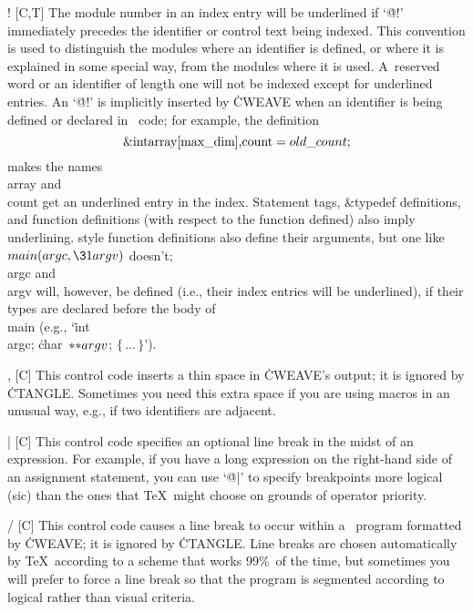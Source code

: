 \@! [C,T] The module number in an index entry will be underlined if `\.{@!}'
immediately precedes the identifier or control text being indexed. This
convention is used to distinguish the modules where an identifier is
defined, or where it is explained in some special way, from the modules
where it is used. A~reserved word or an identifier of length one will not be
indexed except for underlined entries. An `\.{@!}' is implicitly inserted by
\.{CWEAVE} when an identifier is being defined or declared in \Cee\ code;
for example, the definition $$\hbox{\&{int} \\{array}[\\{max\_dim}],
\\{count}${}=\\{old\_count};$}$$ makes the names \\{array} and \\{count} get
an underlined entry in the index.  Statement tags, \&{typedef} definitions,
and function definitions (with respect to the function defined) also imply
underlining.  style function definitions also define their
arguments, but one like $\\{main}(\\{argc},\31\\{argv})$ doesn't; \\{argc}
and \\{argv} will, however, be defined (i.e., their index entries will be
underlined), if their types are declared before the body of \\{main} (e.g.,
`\.{int}~\\{argc}; \.{char}~${**}\\{argv}$; $\{\,\ldots\,\}$').

\@, [C] This control code inserts a thin space in \.{CWEAVE}'s output; it is
ignored by \.{CTANGLE}. Sometimes you need this extra space if you are using
macros in an unusual way, e.g., if two identifiers are adjacent.

\@| [C] This control code specifies an optional line break in the midst of
an expression. For example, if you have
a long expression on the right-hand side of an assignment
statement, you can use `\.{@|}' to specify breakpoints more logical (sic)
than the ones that \TeX\ might choose on grounds of operator priority.

\@/ [C] This control code causes a line break to occur within a \Cee\
program formatted by \.{CWEAVE}; it is ignored by \.{CTANGLE}. Line breaks
are chosen automatically by \TeX\ according to a scheme that works 99\%\
of the time, but sometimes you will prefer to force a line break so that
the program is segmented according to logical rather than visual
criteria.

